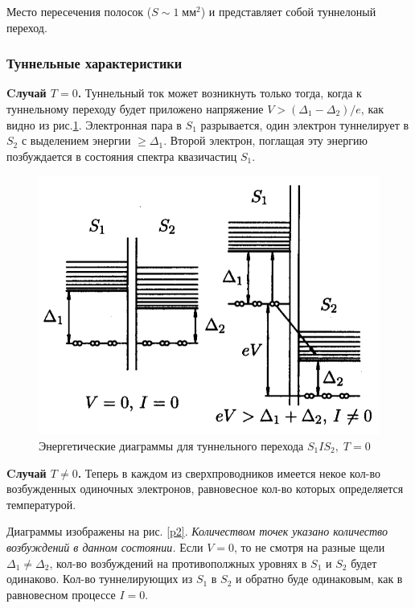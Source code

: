 \documentclass[a4paper]{article}
\begin{document}
Место пересечения полосок ($S \sim 1\; мм^2$) и представляет собой туннелоный переход. 

\subsubsection{Туннельные характеристики}

\textbf{Cлучай $T = 0$.} Туннельный ток может возникнуть только тогда, когда к туннельному переходу будет приложено 
напряжение $V > (\Delta_1 - \Delta_2)/e$, как видно из рис.\ref{p1}. Электронная пара в $S_1$ разрывается, один электрон туннелирует в $S_2$ с 
выделением энергии $\geq \Delta_1$. Второй электрон, поглащая эту энергию позбуждается  в состояния спектра квазичастиц $S_1$.  

\begin{figure}[H]
    \begin{center}
        \includegraphics[scale = 0.5]{p1.png}
        \caption{Энергетические диаграммы для туннельного перехода $S_1IS_2, \; T = 0$}
        \label{p1}
    \end{center}
\end{figure}


\textbf{Cлучай $T \neq 0$.} Теперь в каждом из сверхпроводников имеется некое кол-во возбужденных одиночных электронов, равновесное кол-во которых определяется температурой. \par 

Диаграммы изображены на рис. \ref{p2}. \textit{Количеством точек указано количество возбуждений в данном состоянии.} Если $V = 0$, то не смотря на разные щели $\Delta_1 \neq \Delta_2$, кол-во возбуждений на противополжных уровнях в $S_1$ и $S_2$ будет одинаково.
Кол-во туннелирующих из $S_1$ в $S_2$ и обратно буде одинаковым, как в равновесном процессе $I = 0$. \par 
\end{document}

